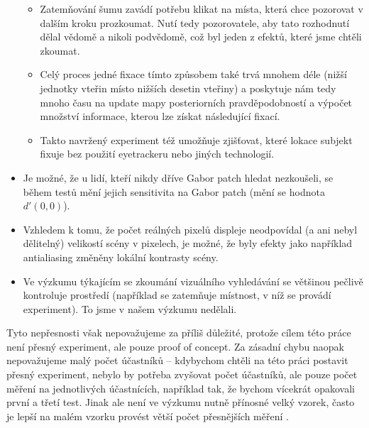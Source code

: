 \begin{itemize}
\begin{itemize}
\item Zatemňování šumu zavádí potřebu klikat na místa, která chce pozorovat v
dalším kroku prozkoumat. Nutí tedy pozorovatele, aby tato rozhodnutí dělal
vědomě a nikoli podvědomě, což byl jeden z efektů, které jsme chtěli zkoumat.

\item Celý proces jedné fixace tímto způsobem také trvá mnohem déle (nižší
jednotky vteřin místo nižších desetin vteřiny) a poskytuje nám tedy mnoho času
na update mapy posteriorních pravděpodobností a výpočet množství informace,
kterou lze získat následující fixací.

\item Takto navržený experiment též umožňuje zjišťovat, které lokace subjekt
fixuje bez použití eyetrackeru nebo jiných technologií.

\end{itemize}

\item Je možné, že u lidí, kteří nikdy dříve Gabor patch hledat nezkoušeli, se
během testů mění jejich sensitivita na Gabor patch (mění se hodnota $d'(0,0)$).

\item Vzhledem k tomu, že počet reálných pixelů displeje neodpovídal (a ani
nebyl dělitelný) velikostí scény v pixelech, je možné, že byly efekty jako
například antialiasing změněny lokální kontrasty scény.

\item Ve výzkumu týkajícím se zkoumání vizuálního vyhledávání se většinou
pečlivě kontroluje prostředí (například se zatemňuje místnost, v níž se provádí experiment). To jsme v našem výzkumu nedělali.

\end{itemize}

Tyto nepřesnosti však nepovažujeme za příliš důležité, protože cílem této práce
není přesný experiment, ale pouze proof of concept. Za zásadní chybu naopak
nepovažujeme malý počet účastníků -- kdybychom chtěli na této práci postavit
přesný experiment, nebylo by potřeba zvyšovat počet účastníků, ale pouze počet
měření na jednotlivých účastnících, například tak, že bychom vícekrát opakovali
první a třetí test. Jinak ale není ve výzkumu nutně přínosné velký vzorek,
často je lepší na malém vzorku provést větší počet přesnějších měření
\citep{SmallN}.

